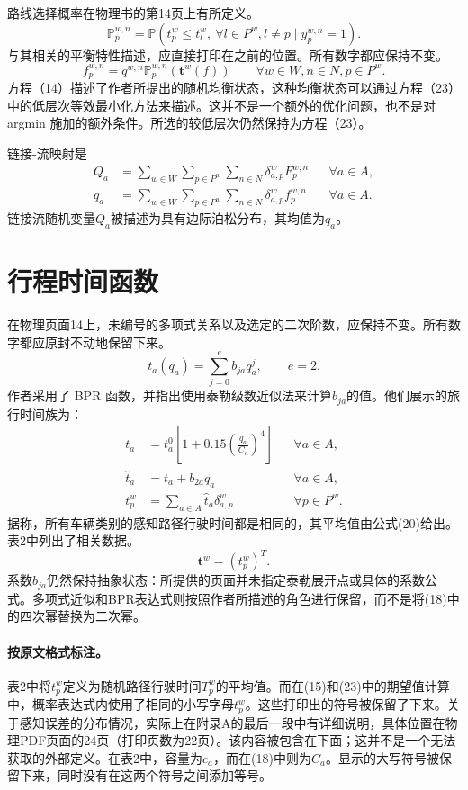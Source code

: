 \documentclass{article}
\begin{document}
路线选择概率在物理书的第14页上有所定义。
\begin{equation}
\mathbb P_p^{w,n}
=\mathbb P\left(t_p^w\leq t_l^w,\ \forall l\in P^w,l\ne p
\mid y_p^{w,n}=1\right).\tag{15}
\end{equation}
与其相关的平衡特性描述，应直接打印在之前的位置。所有数字都应保持不变。
\begin{equation}
f_p^{w,n}=q^{w,n}\mathbb P_p^{w,n}\left(\mathbf t^w(f)\right)
\qquad\forall w\in W,n\in N,p\in P^w.\tag{14}
\end{equation}
方程（14）描述了作者所提出的随机均衡状态，这种均衡状态可以通过方程（23）中的低层次等效最小化方法来描述。这并不是一个额外的优化问题，也不是对 argmin 施加的额外条件。所选的较低层次仍然保持为方程（23）。

链接-流映射是
\begin{align}
Q_a&=\sum_{w\in W}\sum_{p\in P^w}\sum_{n\in N}
\delta_{a,p}^wF_p^{w,n} &&\forall a\in A,\tag{16}\\
q_a&=\sum_{w\in W}\sum_{p\in P^w}\sum_{n\in N}
\delta_{a,p}^wf_p^{w,n} &&\forall a\in A.\tag{17}
\end{align}
链接流随机变量$Q_a$被描述为具有边际泊松分布，其均值为$q_a$。

\section*{行程时间函数}
在物理页面14上，未编号的多项式关系以及选定的二次阶数，应保持不变。所有数字都应原封不动地保留下来。
\[
t_a(q_a)=\sum_{j=0}^{e}b_{ja}q_a^j,\qquad e=2.
\]
作者采用了 BPR 函数，并指出使用泰勒级数近似法来计算$b_{ja}$的值。他们展示的旅行时间族为：
\begin{align}
t_a&=t_a^0\left[1+0.15\left(\frac{q_a}{C_a}\right)^4\right]
&&\forall a\in A,\tag{18}\\
\hat t_a&=t_a+b_{2a}q_a &&\forall a\in A,\tag{19}\\
t_p^w&=\sum_{a\in A}\hat t_a\delta_{a,p}^w
&&\forall p\in P^w.\tag{20}
\end{align}
据称，所有车辆类别的感知路径行驶时间都是相同的，其平均值由公式(20)给出。表2中列出了相关数据。
\[
\mathbf t^w=(t_p^w)^T.
\]
系数$b_{ja}$仍然保持抽象状态：所提供的页面并未指定泰勒展开点或具体的系数公式。多项式近似和BPR表达式则按照作者所描述的角色进行保留，而不是将(18)中的四次幂替换为二次幂。

\paragraph{按原文格式标注。}
表2中将$t_p^w$定义为随机路径行驶时间$T_p^w$的平均值。而在(15)和(23)中的期望值计算中，概率表达式内使用了相同的小写字母$t_p^w$。这些打印出的符号被保留了下来。关于感知误差的分布情况，实际上在附录A的最后一段中有详细说明，具体位置在物理PDF页面的24页（打印页数为22页）。该内容被包含在下面；这并不是一个无法获取的外部定义。在表2中，容量为$c_a$，而在(18)中则为$C_a$。显示的大写符号被保留下来，同时没有在这两个符号之间添加等号。
\end{document}
